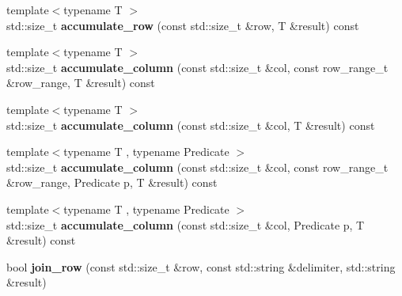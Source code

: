 \begin{DoxyCompactItemize}
\item 
\hypertarget{classstrtk_1_1token__grid_afa2d901a340f5789c48c32f427049edd}{{\footnotesize template$<$typename T $>$ }\\std\-::size\-\_\-t {\bfseries accumulate\-\_\-row} (const std\-::size\-\_\-t \&row, T \&result) const }\label{classstrtk_1_1token__grid_afa2d901a340f5789c48c32f427049edd}

\item 
\hypertarget{classstrtk_1_1token__grid_a6a996c69e4f31b356dd151e0ac5b365e}{{\footnotesize template$<$typename T $>$ }\\std\-::size\-\_\-t {\bfseries accumulate\-\_\-column} (const std\-::size\-\_\-t \&col, const row\-\_\-range\-\_\-t \&row\-\_\-range, T \&result) const }\label{classstrtk_1_1token__grid_a6a996c69e4f31b356dd151e0ac5b365e}

\item 
\hypertarget{classstrtk_1_1token__grid_a0f4a159e1e1522393471c356ffe35442}{{\footnotesize template$<$typename T $>$ }\\std\-::size\-\_\-t {\bfseries accumulate\-\_\-column} (const std\-::size\-\_\-t \&col, T \&result) const }\label{classstrtk_1_1token__grid_a0f4a159e1e1522393471c356ffe35442}

\item 
\hypertarget{classstrtk_1_1token__grid_a721a557982e0c52dc1099dcd4f6d3d2f}{{\footnotesize template$<$typename T , typename Predicate $>$ }\\std\-::size\-\_\-t {\bfseries accumulate\-\_\-column} (const std\-::size\-\_\-t \&col, const row\-\_\-range\-\_\-t \&row\-\_\-range, Predicate p, T \&result) const }\label{classstrtk_1_1token__grid_a721a557982e0c52dc1099dcd4f6d3d2f}

\item 
\hypertarget{classstrtk_1_1token__grid_aca998d410f6711f2f9538d2469dbebb4}{{\footnotesize template$<$typename T , typename Predicate $>$ }\\std\-::size\-\_\-t {\bfseries accumulate\-\_\-column} (const std\-::size\-\_\-t \&col, Predicate p, T \&result) const }\label{classstrtk_1_1token__grid_aca998d410f6711f2f9538d2469dbebb4}

\item 
\hypertarget{classstrtk_1_1token__grid_a892435b18509516efb1fd3868bf4cdd2}{bool {\bfseries join\-\_\-row} (const std\-::size\-\_\-t \&row, const std\-::string \&delimiter, std\-::string \&result)}\label{classstrtk_1_1token__grid_a892435b18509516efb1fd3868bf4cdd2}


\end{DoxyCompactItemize}

